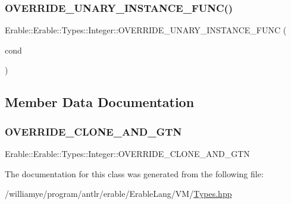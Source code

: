 \subsubsection{\texorpdfstring{OVERRIDE\_UNARY\_INSTANCE\_FUNC()}{OVERRIDE\_UNARY\_INSTANCE\_FUNC()}}
{\footnotesize\ttfamily Erable\+::\+Erable\+::\+Types\+::\+Integer\+::\+O\+V\+E\+R\+R\+I\+D\+E\+\_\+\+U\+N\+A\+R\+Y\+\_\+\+I\+N\+S\+T\+A\+N\+C\+E\+\_\+\+F\+U\+NC (\begin{DoxyParamCaption}\item[{cond}]{ }\end{DoxyParamCaption})}



\subsection{Member Data Documentation}
\mbox{\label{class_erable_1_1_erable_1_1_types_1_1_integer_a42b591edd7b42ff1dbeb9e174c7c332f}} 
\subsubsection{\texorpdfstring{OVERRIDE\_CLONE\_AND\_GTN}{OVERRIDE\_CLONE\_AND\_GTN}}
{\footnotesize\ttfamily Erable\+::\+Erable\+::\+Types\+::\+Integer\+::\+O\+V\+E\+R\+R\+I\+D\+E\+\_\+\+C\+L\+O\+N\+E\+\_\+\+A\+N\+D\+\_\+\+G\+TN}



The documentation for this class was generated from the following file\+:\begin{DoxyCompactItemize}
\item 
/williamye/program/antlr/erable/\+Erable\+Lang/\+V\+M/\mbox{\hyperlink{_types_8hpp}{Types.\+hpp}}\end{DoxyCompactItemize}
